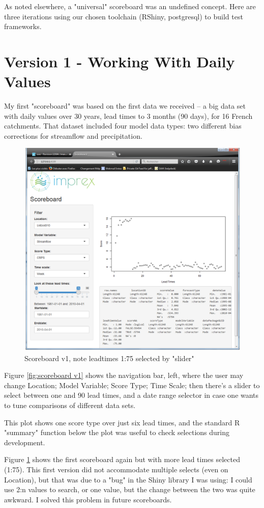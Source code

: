 \documentclass[logos,parttoc,morelanguage=french,morelanguage=german]{orsay-memoire}
\begin{document}
As noted elsewhere, a "universal" scoreboard was an undefined concept. Here are three iterations using our chosen toolchain (RShiny, postgresql) to build test frameworks.

\section{Version 1 - Working With Daily Values}
My first "scoreboard" was based on the first data we received -- a big data set with daily values over 30 years, lead times to 3 months (90 days), for 16 French catchments. That dataset included four model data types: two different bias corrections for streamflow and precipitation.

\begin{figure}[!ht]
\centering
\includegraphics[width=0.8\linewidth]{images/sbdV1v21notes2.png}
  \caption{Scoreboard v1, note leadtimes 1:75 selected by "slider"}
  \label{fig:scoreboard v1.2}
\end{figure}

Figure \ref{fig:scoreboard v1} shows the navigation bar, left, where the user may change Location; Model Variable; Score Type; Time Scale; then there's a slider to select between one and 90 lead times, and a date range selector in case one wants to tune comparisons of different data sets. 

This plot shows one score type over just six lead times, and the standard R "summary" function below the plot was useful to check selections during development.

Figure \ref{fig:scoreboard v1.2} shows the first scoreboard again but with more lead times selected (1:75). This first version did not accommodate multiple selects (even on Location), but that was due to a "bug" in the Shiny library I was using: I could use 2:n values to search, or one value, but the change between the two was quite awkward. I solved this problem in future scoreboards.
\end{document}
